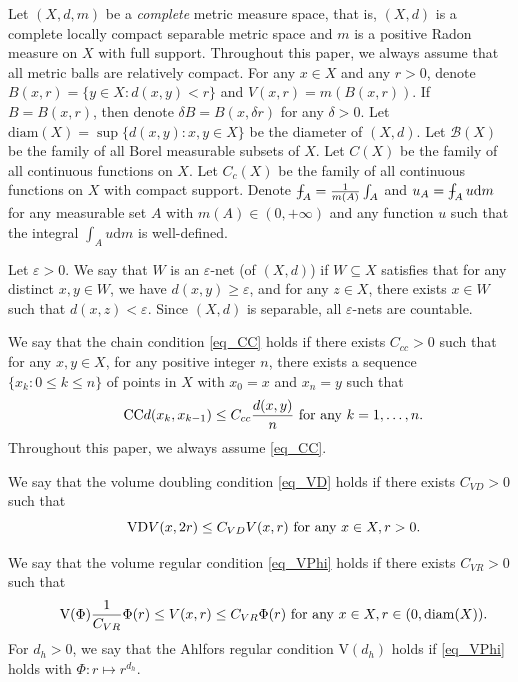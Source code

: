 \documentclass[11pt,a4paper]{article}
\numberwithin{equation}{section}
\def\Xint#1{\mathchoice
{\XXint\displaystyle\textstyle{#1}}%
{\XXint\textstyle\scriptstyle{#1}}%
{\XXint\scriptstyle\scriptscriptstyle{#1}}%
{\XXint\scriptscriptstyle\scriptscriptstyle{#1}}%
\!\int}
\def\XXint#1#2#3{{\setbox0=\hbox{$#1{#2#3}{\int}$ }
\vcenter{\hbox{$#2#3$ }}\kern-.6\wd0}}
\def\dashint{\Xint-}
\theoremstyle{plain}
\theoremstyle{definition}
\begin{document}
Let $(X,d,m)$ be a \emph{complete} metric measure space, that is, $(X,d)$ is a complete locally compact separable metric space and $m$ is a positive Radon measure on $X$ with full support. Throughout this paper, we always assume that all metric balls are relatively compact. For any $x\in X$ and any $r>0$, denote $B(x,r)=\{y\in X:d(x,y)<r\}$ and $V(x,r)=m(B(x,r))$. If $B=B(x,r)$, then denote $\delta B=B(x,\delta r)$ for any $\delta>0$. Let $\mathrm{diam}(X)=\sup\{d(x,y):x,y\in X\}$ be the diameter of $(X,d)$. Let $\mathcal{B}(X)$ be the family of all Borel measurable subsets of $X$. Let $C(X)$ be the family of all continuous functions on $X$. Let $C_c(X)$ be the family of all continuous functions on $X$ with compact support. Denote $\dashint_A=\frac{1}{m(A)}\int_A$ and $u_A=\dashint_Au\mathrm{d} m$ for any measurable set $A$ with $m(A)\in(0,+\infty)$ and any function $u$ such that the integral $\int_Au\mathrm{d} m$ is well-defined.

Let $\varepsilon>0$. We say that $W$ is an $\varepsilon$-net (of $(X,d)$) if $W\subseteq X$ satisfies that for any distinct $x,y\in W$, we have $d(x,y)\ge \varepsilon$, and for any $z\in X$, there exists $x\in W$ such that $d(x,z)< \varepsilon$. Since $(X,d)$ is separable, all $\varepsilon$-nets are countable.

We say that the chain condition \ref{eq_CC} holds if there exists $C_{cc}>0$ such that for any $x,y\in X$, for any positive integer $n$, there exists a sequence $\{x_k:0\le k\le n\}$ of points in $X$ with $x_0=x$ and $x_n=y$ such that
\begin{equation*}\label{eq_CC}\tag*{$\text{CC}$}
d(x_k,x_{k-1})\le C_{cc} \frac{d(x,y)}{n}\text{ for any }k=1,\ldots,n.
\end{equation*}
Throughout this paper, we always assume \ref{eq_CC}.

We say that the volume doubling condition \ref{eq_VD} holds if there exists $C_{VD}>0$ such that
\begin{equation*}\label{eq_VD}\tag*{$\text{VD}$}
V(x,2r)\le C_{VD}V(x,r)\text{ for any }x\in X,r>0.
\end{equation*}

We say that the volume regular condition \ref{eq_VPhi} holds if there exists $C_{VR}>0$ such that
\begin{equation*}\label{eq_VPhi}\tag*{$\text{V}(\Phi)$}
\frac{1}{C_{VR}}\Phi(r)\le V(x,r)\le C_{VR}\Phi(r)\text{ for any }x\in X,r\in(0,\mathrm{diam}(X)).
\end{equation*}
For $d_h>0$, we say that the Ahlfors regular condition \hypertarget{eq_Vdh}{$\text{V}(d_h)$} holds if \ref{eq_VPhi} holds with $\Phi:r\mapsto r^{d_h}$.
\end{document}
